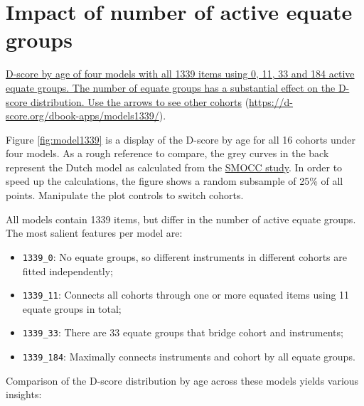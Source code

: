 \documentclass[
]{book}
\providecommand{\tightlist}{%
  \setlength{\itemsep}{0pt}\setlength{\parskip}{0pt}}
\begin{document}
\hypertarget{sec:impactequate}{%
\section{Impact of number of active equate groups}\label{sec:impactequate}}

\label{fig:model1339}\href{https://d-score.org/dbook-apps/models1339/\#display=by_model_cohort\&nrow=2\&ncol=2\&arr=row\&pg=7\&labels=cohort,model\&sort=cohort;asc,model;asc\&filter=\&sidebar=\&fv=}{D-score by age of four models with all 1339 items using 0, 11, 33 and 184 active equate groups. The number of equate groups has a substantial effect on the D-score distribution. Use the arrows to see other cohorts} (\url{https://d-score.org/dbook-apps/models1339/}).



Figure \ref{fig:model1339} is a display of the D-score by age for all 16 cohorts under four models. As a rough reference to compare, the grey curves in the back represent the Dutch model as calculated from the \href{https://d-score.org/dbook1/sec-smoccstudy.html}{SMOCC study}. In order to speed up the calculations, the figure shows a random subsample of 25\% of all points. Manipulate the plot controls to switch cohorts.

All models contain 1339 items, but differ in the number of active equate groups. The most salient features per model are:

\begin{itemize}
\tightlist
\item
  \texttt{1339\_0}: No equate groups, so different instruments in different cohorts are fitted independently;
\item
  \texttt{1339\_11}: Connects all cohorts through one or more equated items using 11 equate groups in total;
\item
  \texttt{1339\_33}: There are 33 equate groups that bridge cohort and instruments;
\item
  \texttt{1339\_184}: Maximally connects instruments and cohort by all equate groups.
\end{itemize}

Comparison of the D-score distribution by age across these models yields various insights:
\end{document}
